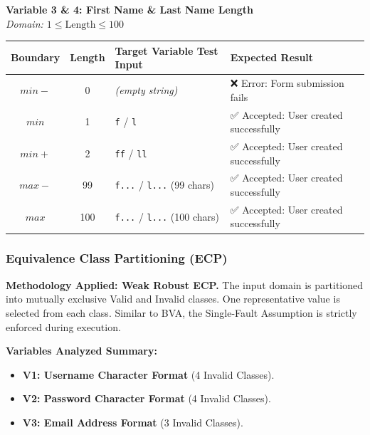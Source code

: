\documentclass[twoside,final]{hcmut-report}
\begin{document}
\vspace{0.3cm}
\noindent\textbf{Variable 3 \& 4: First Name \& Last Name Length} \\
\textit{Domain: $1 \le \text{Length} \le 100$}
\begin{table}[H]
\centering
\renewcommand{\arraystretch}{1.2}
\begin{tabularx}{\textwidth}{|c|c|l|X|}
\hline
\textbf{Boundary} & \textbf{Length} & \textbf{Target Variable Test Input} & \textbf{Expected Result} \\ \hline
$min-$ & 0 & \textit{(empty string)} & ❌ Error: Form submission fails \\ \hline
$min$ & 1 & \texttt{f} / \texttt{l} & ✅ Accepted: User created successfully \\ \hline
$min+$ & 2 & \texttt{ff} / \texttt{ll} & ✅ Accepted: User created successfully \\ \hline
$max-$ & 99 & \texttt{f...} / \texttt{l...} (99 chars) & ✅ Accepted: User created successfully \\ \hline
$max$ & 100 & \texttt{f...} / \texttt{l...} (100 chars) & ✅ Accepted: User created successfully \\ \hline
\end{tabularx}
\end{table}

\subsubsection{Equivalence Class Partitioning (ECP)}
\textbf{Methodology Applied: Weak Robust ECP.}
The input domain is partitioned into mutually exclusive Valid and Invalid classes. One representative value is selected from each class. Similar to BVA, the Single-Fault Assumption is strictly enforced during execution.

\textbf{Variables Analyzed Summary:}
\begin{itemize}
    \item \textbf{V1: Username Character Format} (4 Invalid Classes).
    \item \textbf{V2: Password Character Format} (4 Invalid Classes).
    \item \textbf{V3: Email Address Format} (3 Invalid Classes).
\end{itemize}
\end{document}
